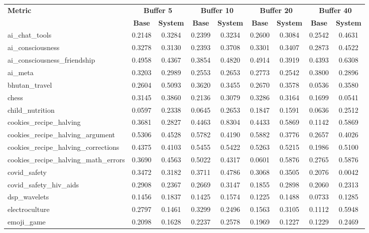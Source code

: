\documentclass[pdflatex,sn-mathphys-num]{sn-jnl}%
\theoremstyle{thmstyleone}%
\theoremstyle{thmstyletwo}%
\theoremstyle{thmstylethree}%
\begin{document}
\begin{appendices}
\begin{landscape}
\begin{longtable}{@{}p{3.8cm}cccccccc@{}}
\toprule
\textbf{Metric} & \multicolumn{2}{c}{\textbf{Buffer 5}} & \multicolumn{2}{c}{\textbf{Buffer 10}} & \multicolumn{2}{c}{\textbf{Buffer 20}} & \multicolumn{2}{c}{\textbf{Buffer 40}} \\
\cmidrule(lr){2-3}\cmidrule(lr){4-5}\cmidrule(lr){6-7}\cmidrule(lr){8-9}
 & \textbf{Base} & \textbf{System} & \textbf{Base} & \textbf{System} & \textbf{Base} & \textbf{System} & \textbf{Base} & \textbf{System} \\
\midrule
\endhead
ai\_chat\_tools & 0.2148 & 0.3284 & 0.2399 & 0.3234 & 0.2600 & 0.3084 & 0.2542 & 0.4631 \\
ai\_consciousness & 0.3278 & 0.3130 & 0.2393 & 0.3708 & 0.3301 & 0.3407 & 0.2873 & 0.4522 \\
ai\_consciousness\_friendship & 0.4958 & 0.4367 & 0.3854 & 0.4820 & 0.4914 & 0.3919 & 0.4393 & 0.6308 \\
ai\_meta & 0.3203 & 0.2989 & 0.2553 & 0.2653 & 0.2773 & 0.2542 & 0.3800 & 0.2896 \\
bhutan\_travel & 0.2604 & 0.5093 & 0.3620 & 0.3455 & 0.2670 & 0.3578 & 0.0536 & 0.3580 \\
chess & 0.3145 & 0.3860 & 0.2136 & 0.3079 & 0.3286 & 0.3164 & 0.1699 & 0.0541 \\
child\_nutrition & 0.0597 & 0.2338 & 0.0645 & 0.2653 & 0.1847 & 0.1591 & 0.0636 & 0.2512 \\
cookies\_recipe\_halving & 0.3681 & 0.2827 & 0.4463 & 0.8304 & 0.4433 & 0.5869 & 0.1142 & 0.5869 \\
cookies\_recipe\_halving\_argument & 0.5306 & 0.4528 & 0.5782 & 0.4190 & 0.5882 & 0.3776 & 0.2657 & 0.4026 \\
cookies\_recipe\_halving\_corrections & 0.4375 & 0.4103 & 0.5455 & 0.5422 & 0.5263 & 0.5215 & 0.1986 & 0.5100 \\
cookies\_recipe\_halving\_math\_errors & 0.3690 & 0.4563 & 0.5022 & 0.4317 & 0.0601 & 0.5876 & 0.2765 & 0.5876 \\
covid\_safety & 0.3472 & 0.3182 & 0.3711 & 0.4786 & 0.3068 & 0.3505 & 0.2076 & 0.0042 \\
covid\_safety\_hiv\_aids & 0.2908 & 0.2367 & 0.2669 & 0.3147 & 0.1855 & 0.2898 & 0.2060 & 0.2313 \\
dsp\_wavelets & 0.1456 & 0.1837 & 0.1425 & 0.1574 & 0.1225 & 0.1488 & 0.0733 & 0.1285 \\
electroculture & 0.2797 & 0.1461 & 0.3299 & 0.2496 & 0.1563 & 0.3105 & 0.1112 & 0.5948 \\
emoji\_game & 0.2098 & 0.1628 & 0.2237 & 0.2578 & 0.1969 & 0.1227 & 0.1229 & 0.2469 \\

\end{longtable}
\end{landscape}
\end{appendices}
\end{document}
